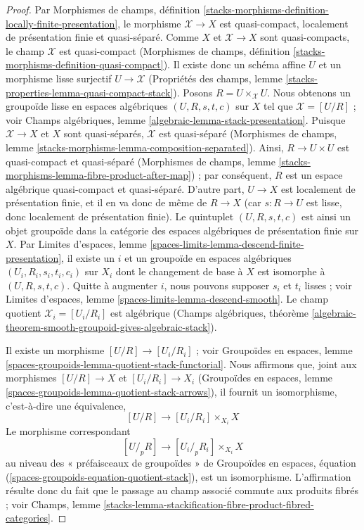 \begin{proof}
Par Morphismes de champs, définition
\ref{stacks-morphisms-definition-locally-finite-presentation}, le morphisme
$\mathcal{X} \to X$ est quasi-compact, localement de présentation finie et
quasi-séparé. Comme $X$ et $\mathcal{X} \to X$ sont quasi-compacts, le champ
$\mathcal{X}$ est quasi-compact (Morphismes de champs, définition
\ref{stacks-morphisms-definition-quasi-compact}). Il existe donc un schéma
affine $U$ et un morphisme lisse surjectif $U \to \mathcal{X}$ (Propriétés
des champs, lemme \ref{stacks-properties-lemma-quasi-compact-stack}). Posons
$R = U \times_\mathcal{X} U$. Nous obtenons un groupoïde lisse en espaces
algébriques $(U, R, s, t, c)$ sur $X$ tel que $\mathcal{X} = [U/R]$ ; voir
Champs algébriques, lemme \ref{algebraic-lemma-stack-presentation}. Puisque
$\mathcal{X} \to X$ et $X$ sont quasi-séparés, $\mathcal{X}$ est
quasi-séparé (Morphismes de champs, lemme
\ref{stacks-morphisms-lemma-composition-separated}). Ainsi,
$R \to U \times U$ est quasi-compact et quasi-séparé (Morphismes de champs,
lemme \ref{stacks-morphisms-lemma-fibre-product-after-map}) ; par conséquent,
$R$ est un espace algébrique quasi-compact et quasi-séparé. D'autre part,
$U \to X$ est localement de présentation finie, et il en va donc de même de
$R \to X$ (car $s : R \to U$ est lisse, donc localement de présentation
finie). Le quintuplet $(U, R, s, t, c)$ est ainsi un objet groupoïde dans la
catégorie des espaces algébriques de présentation finie sur $X$. Par Limites
d'espaces, lemme \ref{spaces-limits-lemma-descend-finite-presentation}, il
existe un $i$ et un groupoïde en espaces algébriques
$(U_i, R_i, s_i, t_i, c_i)$ sur $X_i$ dont le changement de base à $X$ est
isomorphe à $(U, R, s, t, c)$. Quitte à augmenter $i$, nous pouvons supposer
$s_i$ et $t_i$ lisses ; voir Limites d'espaces, lemme
\ref{spaces-limits-lemma-descend-smooth}. Le champ quotient
$\mathcal{X}_i = [U_i/R_i]$ est algébrique (Champs algébriques, théorème
\ref{algebraic-theorem-smooth-groupoid-gives-algebraic-stack}).

\medskip\noindent
Il existe un morphisme $[U/R] \to [U_i/R_i]$ ; voir Groupoïdes en espaces,
lemme \ref{spaces-groupoids-lemma-quotient-stack-functorial}. Nous affirmons
que, joint aux morphismes $[U/R] \to X$ et $[U_i/R_i] \to X_i$ (Groupoïdes
en espaces, lemme \ref{spaces-groupoids-lemma-quotient-stack-arrows}), il
fournit un isomorphisme, c'est-à-dire une équivalence,
$$
[U/R] \longrightarrow [U_i/R_i] \times_{X_i} X
$$
Le morphisme correspondant
$$
[U/_{\!p}R] \longrightarrow [U_i/_{\!p}R_i] \times_{X_i} X
$$
au niveau des « préfaisceaux de groupoïdes » de Groupoïdes en espaces,
équation (\ref{spaces-groupoids-equation-quotient-stack}), est un
isomorphisme. L'affirmation résulte donc du fait que le passage au champ
associé commute aux produits fibrés ; voir Champs, lemme
\ref{stacks-lemma-stackification-fibre-product-fibred-categories}.
\end{proof}




